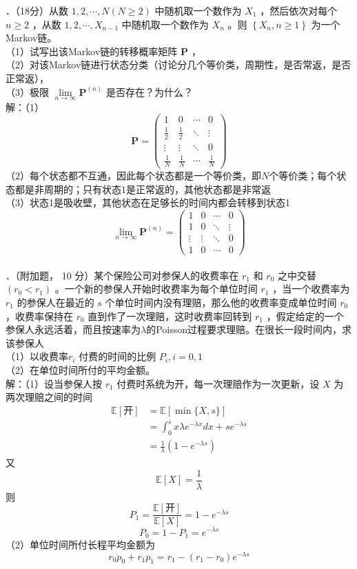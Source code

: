\documentclass[UTF8]{ctexart}
\begin{document}
．（18分）从数 $1,2, \cdots, N(N \geq 2)$ 中随机取一个数作为 $X_{1}$ ，然后依次对每个 $n \geq 2$ ，从数 $1,2, \cdots, X_{n-1}$ 中随机取一个数作为 $X_{n}$ 。则 $\left\{X_{n}, n \geq 1\right\}$ 为一个Markov链。\\
（1）试写出该Markov链的转移概率矩阵 $\mathbf{P}$ ，\\
（2）对该Markov链进行状态分类（讨论分几个等价类，周期性，是否常返，是否正常返），\\
（3）极限 $\lim\limits_{n \rightarrow \infty} \mathbf{P}^{(n)}$ 是否存在？为什么？\\
解：（1）
\[
\mathbf{P}=
\begin{pmatrix}
	1 & 0 & \cdots & 0 \\
	\frac{1}{2} & \frac{1}{2} & \ddots & \vdots \\
	\vdots & \vdots & \ddots & 0 \\
	\frac{1}{N}&\frac{1}{N} & \cdots & \frac{1}{N}
\end{pmatrix}
\]
（2）每个状态都不互通，因此每个状态都是一个等价类，即$N$个等价类；每个状态都是非周期的；只有状态1是正常返的，其他状态都是非常返\\
（3）状态1是吸收壁，其他状态在足够长的时间内都会转移到状态1
\[
\lim\limits_{n \rightarrow \infty} \mathbf{P}^{(n)}=
\begin{pmatrix}
	1 & 0 & \cdots & 0 \\
	1 & 0 & \ddots & \vdots \\
	\vdots & \vdots & \ddots & 0 \\
	1&0 & \cdots & 0
\end{pmatrix}
\]\\



．（附加题， 10 分）某个保险公司对参保人的收费率在 $r_{1}$ 和 $r_{0}$ 之中交替 $\left(r_{0}<r_{1}\right)$ 。一个新的参保人开始时收费率为每个单位时间 $r_{1}$ ，当一个收费率为 $r_{1}$ 的参保人在最近的 $s$ 个单位时间内没有理赔，那么他的收费率变成单位时间 $r_{0}$ ，收费率保持在 $r_{0}$ 直到作了一次理赔，这时收费率回转到 $r_{1}$ ，假定给定的一个参保人永远活着，而且按速率为$\lambda$的Poisson过程要求理赔。在很长一段时间内，求该参保人\\
（1）以收费率$r_{i}$ 付费的时间的比例 $P_{i}, i=0,1$ \\
（2）在单位时间所付的平均金额。\\
解：（1）设当参保人按 $r_1$ 付费时系统为开，每一次理赔作为一次更新，设 $X$ 为两次理赔之间的时间
$$
\begin{aligned}
	 \mathbb{E}[\text{开}]&=\mathbb{E}[\min \{X,s\}]\\
	 &=\int_0^s x\lambda e^{-\lambda x} d x+s e^{-\lambda s} \\
	& =\frac{1}{\lambda}\left(1-e^{-\lambda s}\right) 
\end{aligned}
$$
又
\[
\mathbb{E}[X]=\frac{1}{\lambda}
\]
则
\[
P_1=\frac{\mathbb{E}[\text{开}]}{\mathbb{E}[X]}=1-e^{-\lambda s}
\]
\[
P_0=1-P_1=e^{-\lambda s}
\]
（2）单位时间所付长程平均金额为
$$
r_0 p_0+r_1 p_1=r_1-\left(r_1-r_0\right) e^{-\lambda s}
$$
\end{document}
